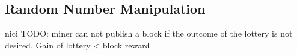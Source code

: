 \subsection{Random Number Manipulation}\label{subsection:random-number-manipulation}
nici
TODO: miner can not publish a block if the outcome of the lottery is not desired. Gain of lottery < block reward